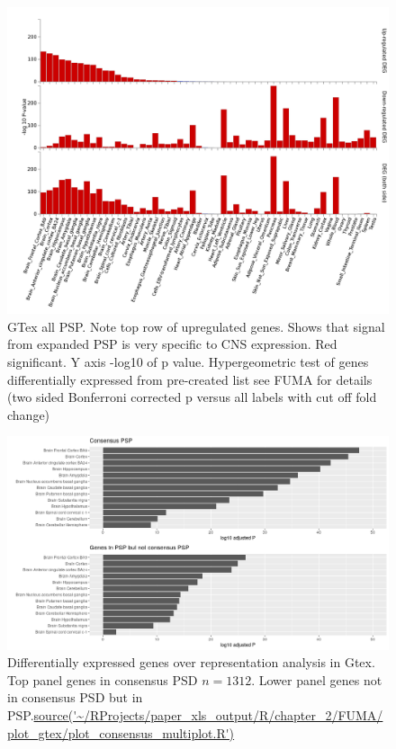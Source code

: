 \begin{figure}
    \centering
    \includegraphics[width=\textwidth]{images/FUMA_plots/gtex_v8_ts_FUMA_PSP_gtex.png}
    \caption[GTEx All PSP]{GTex all PSP. Note top row of upregulated genes. Shows that signal from expanded PSP is very specific to CNS expression. Red significant. Y axis -log10 of p value. Hypergeometric test of genes differentially expressed from pre-created list see FUMA \cite{watanabe2017functional} for details (two sided Bonferroni corrected p versus all labels with cut off fold change) }
    \label{fig:gtex all PSP}
\end{figure}
\clearpage


\begin{figure}
    \centering
    \includegraphics[width=\textwidth]{images/chapter2/ggplot/Rplot_consensusgtex.png}
    \caption{Differentially expressed genes over representation analysis in Gtex. Top panel genes in consensus PSD $n=1312$. Lower panel genes not in consensus PSD but in PSP.\url{source('~/RProjects/paper_xls_output/R/chapter_2/FUMA/plot_gtex/plot_consensus_multiplot.R')}}
    \label{fig:deg_gtex_psp}
\end{figure}



